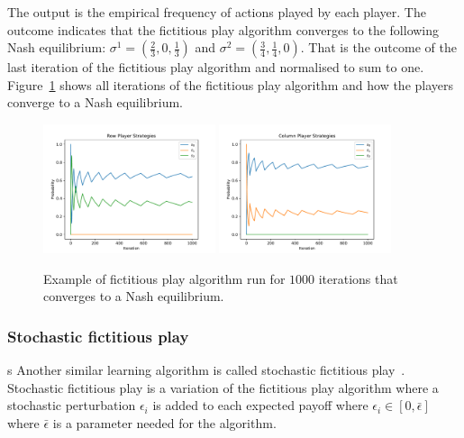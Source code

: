 The output is the empirical frequency of actions played by each player.
The outcome indicates that the fictitious play algorithm converges to the
following Nash equilibrium: \(\sigma^1 = (\frac{2}{3}, 0, \frac{1}{3})\) and
\(\sigma^2 = (\frac{3}{4}, \frac{1}{4}, 0)\).
That is the outcome of the last iteration of the fictitious play algorithm and
normalised to sum to one.
Figure~\ref{fig:fictitious_play} shows all iterations of the fictitious play
algorithm and how the players converge to a Nash equilibrium.

\begin{figure}[H]
    \centering
    \includegraphics[width=0.45\textwidth]{chapters/04_game_theoretic_model/Bin/learning_algorithms_example/fictitious_row.pdf}
    \includegraphics[width=0.45\textwidth]{chapters/04_game_theoretic_model/Bin/learning_algorithms_example/fictitious_col.pdf}
    \caption{Example of fictitious play algorithm run for \(1000\) iterations
    that converges to a Nash equilibrium.}
    \label{fig:fictitious_play}
\end{figure}


\subsubsection{Stochastic fictitious play}s
Another similar learning algorithm is called stochastic fictitious
play~\cite{hofbauerstochasticfictitous, fudenberg1998theory}.
Stochastic fictitious play is a variation of the fictitious play algorithm
where a stochastic perturbation \(\epsilon_i\) is added to each expected payoff
where \(\epsilon_i \in [0, \bar{\epsilon}]\) where \(\bar{\epsilon}\) is a
parameter needed for the algorithm.


